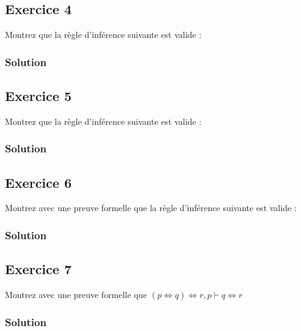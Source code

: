 \subsection*{Exercice 4}
Montrez que la règle d'inférence suivante est valide :

\subsubsection*{Solution}

\subsection*{Exercice 5}
Montrez que la règle d'inférence suivante est valide :


\subsubsection*{Solution}

\subsection*{Exercice 6}
Montrez avec une preuve formelle que la règle d'inférence suivante est valide :

\subsubsection*{Solution}

\subsection*{Exercice 7}
Montrez avec une preuve formelle que $(p\Leftrightarrow q)\Leftrightarrow r,p \vdash q \Leftrightarrow r$

\subsubsection*{Solution}


